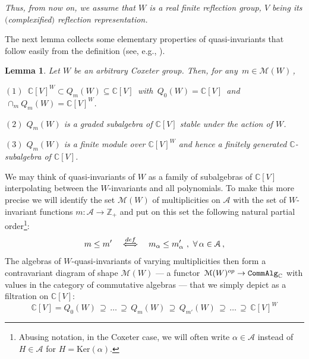 \documentclass[11pt]{amsart}
\newtheorem{lemma}[theorem]{Lemma}
\theoremstyle{definition}
\theoremstyle{remark}
\numberwithin{equation}{section}
\newcommand{\la}{\label}
\newcommand{\Ker}{\mathrm{Ker}}
\def\C{\mathbb C}
\def\c{\mathbb{C}}
\def\A{\mathcal{A}}
\def\M{\mathcal{M}}
\def\Z{\mathbb{Z}}
\begin{document}
{\it Thus, from now on, we assume that $W$ is a real finite reflection group, 
$V$ being its $($complexified$)$ reflection representation.} 

\vspace{1ex}

The next lemma collects some elementary properties of quasi-invariants that follow easily from the definition (see, e.g., \cite{BEG03}).
%
\begin{lemma}
\la{L1}
Let $W$ be an arbitrary Coxeter group. Then, for any $\, m \in \M(W)\,$, 

$(1)$ $\,\c[V]^W \subset Q_m(W) \subseteq \c[V]\,$ with $\, Q_0(W) = \c[V] \,$ and $\,\cap_{m} Q_m(W) = \c[V]^W $.

$(2)$ $ Q_m(W) $ is a graded subalgebra of $ \c[V] $ stable under the action of $W$.

$(3)$ $ Q_m(W) $ is a finite module over $ \c[V]^W $ and hence a finitely generated $\c$-subalgebra
of $\c[V]$. 

\end{lemma}
%
We may think of quasi-invariants of $W$ as a family of subalgebras of $\c[V]$ interpolating between the $W$-invariants and all polynomials. 
To make this more precise we will identify
the set $\M(W)$ of multiplicities on $\A$ with the set of $W$-invariant functions $ m: \A \to \Z_+ $ and put on this set the following natural partial order\footnote{Abusing notation, in the Coxeter case, we will often write $ \alpha \in \A $ instead of $ H \in \A $ 
for $ H = \Ker(\alpha)$.}:
%
$$
m \le  m' \quad \stackrel{\rm def}{\Longleftrightarrow} \quad m_{\alpha} \le m_{\alpha}'\ ,\ \forall\, \alpha \in \A\, ,
$$
%
The algebras of $W$-quasi-invariants of varying multiplicities then form a contravariant diagram of shape $\M(W) $ --- a functor $\,\M(W)^{\rm op} \to {\tt Comm Alg}_{\C} $ with values in the category of commutative algebras --- that we simply depict as a
filtration on $ \C[V] $:
%
\begin{equation}
\la{Qtow}
\c[V] = Q_0(W)\, \supseteq\, \ldots\, \supseteq\, Q_m(W)\, \supseteq \,Q_{m'}(W) \,\supseteq\, \ldots \, \supseteq \,\c[V]^W
\end{equation}
%
\end{document}
